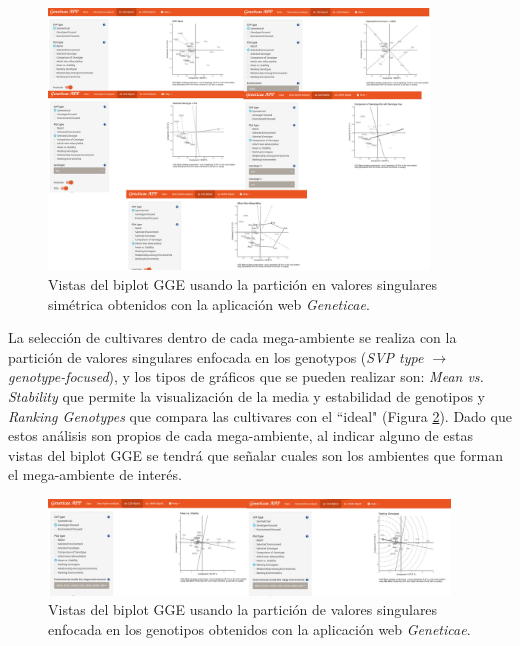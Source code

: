 \begin{figure}[H]
	\begin{center}
		\includegraphics[width=0.9\textwidth]{./Graficos/www/GGE_biplotAPP1.png}
	\end{center}
	\caption{Vistas del biplot GGE usando la partición en valores singulares simétrica obtenidos con la aplicación web \emph{Geneticae}.}
	\label{fig:ggebip1}
\end{figure}

La selección de cultivares dentro de cada mega-ambiente se realiza con la partición de valores singulares enfocada en los genotypos (\emph{SVP type $\rightarrow$ genotype-focused}), y los tipos de gráficos que se pueden realizar son: \emph{Mean vs. Stability} que permite la visualización de la media y estabilidad de genotipos y \emph{Ranking Genotypes} que compara las cultivares con el ``ideal" (Figura \ref{fig:ggebip2}). Dado que estos análisis son propios de cada mega-ambiente, al indicar alguno de estas vistas del biplot GGE se tendrá que señalar cuales son los ambientes que forman el mega-ambiente de interés. 


\begin{figure}[h]
	\begin{center}
		\includegraphics[width=0.95\textwidth]{./Graficos/www/GGE_biplotAPP2.png}
	\end{center}
	\caption{Vistas del biplot GGE usando la partición de valores singulares enfocada en los genotipos obtenidos con la aplicación web \emph{Geneticae}.}
	\label{fig:ggebip2}
\end{figure}

